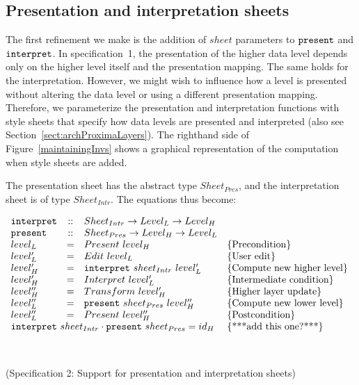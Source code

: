 %																
%																
%																
\subsection{Presentation and interpretation sheets} \label{sect:maintainingSheet}

The first refinement we make is the addition of $sheet$ parameters to ${\tt present}$ and ${\tt interpret}$. In specification~1, the presentation of the higher data level depends only on the higher level itself and the presentation mapping. The same holds for the interpretation. However, we might wish to influence how a level is presented without altering the data level or using a different presentation mapping. Therefore, we parameterize the presentation and interpretation functions with style sheets that specify how data levels are presented and interpreted (also see Section~\ref{sect:archProximaLayers}). The righthand side of Figure~\ref{maintainingInvs} shows a graphical representation of the computation when style sheets are added. 

The presentation sheet has the abstract type $Sheet_{Pres}$, and the interpretation sheet is of type $Sheet_{Intr}$. The equations thus become:

\begin{small}\( \begin{array}{lcll} \label{inv:sheets}
{\tt interpret} &::& Sheet_{Intr} \rightarrow  Level_{L} \rightarrow Level_{H} \\
{\tt present} &::& Sheet_{Pres} \rightarrow  Level_{H} \rightarrow Level_{L} \\
level_{L} & = & Present~level_{H}					& \text{\{Precondition\}}\\
level'_{L} & = & Edit~level_{L}						& \text{\{User edit\}}\\
level'_{H} & = & {\tt interpret}~sheet_{Intr}~level'_{L}	& \text{\{Compute new higher level\}}\\
level'_{H} & = & Interpret~level'_{L}					& \text{\{Intermediate condition\}}\\
level''_{H}& = & Transform~level'_{H} 					& \text{\{Higher layer update\}}\\
level''_{L} & = & {\tt present}~sheet_{Pres}~level''_{H}    & \text{\{Compute new lower level\}}\\
level''_{L} & = & Present~level''_{H}					& \text{\{Postcondition\}}\\
\lefteqn{{\tt interpret}~sheet_{Intr} \cdot {\tt present}~sheet_{Pres} = id_{H}} & & & \text{\{***add this one?***\}}\\
\end{array}\)\end{small}\\
\begin{center}(Specification 2: Support for presentation and interpretation sheets)\end{center}\vspace{1em}

